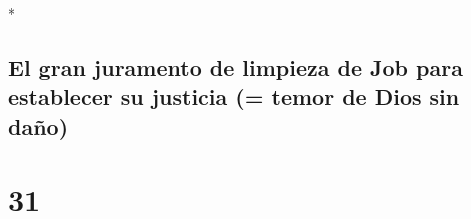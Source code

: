 \begin{paracol}{2}
\begin{otherlanguage}{english}
\end{otherlanguage}

\switchcolumn[0]*

\hypertarget{el-gran-juramento-de-limpieza-de-job-para-establecer-su-justicia-temor-de-dios-sin-dauxf1o}{%
\subsection{El gran juramento de limpieza de Job para establecer su
justicia (= temor de Dios sin
daño)}\label{el-gran-juramento-de-limpieza-de-job-para-establecer-su-justicia-temor-de-dios-sin-dauxf1o}}

\hypertarget{section-60}{%
\section{31}\label{section-60}}


\end{paracol}
